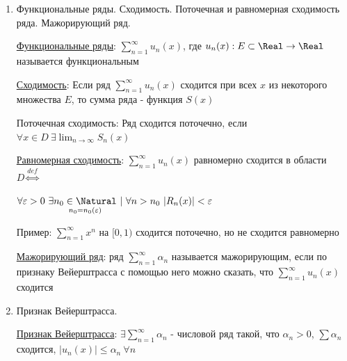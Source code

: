 \documentclass[12pt]{article}
\begin{document}
\begin{enumerate}
    \hyperlink{changingsignseries}{Знакопеременные ряды}: $\sum_{n = 1}^\infty u_n$, где $u_n$ - любого знака и не все $u_n$ одного знака

    \hyperlink{absoluteconvergence}{Абсолютная сходимость}: $\sum_{n = 1}^\infty |u_n|$ сходится $\Longrightarrow \sum_{n = 1}^\infty u_n$ сходится абсолютно

    \hyperlink{conditionalconvergence}{Условная сходимость}: $\sum_{n = 1}^\infty u_n$ сходится условно, если $\sum_{n = 1}^\infty |u_n|$ расходится

\subsection{X.2. Функциональные ряды.}

    \item Функциональные ряды. Сходимость. Поточечная и равномерная сходимость ряда.
    Мажорирующий ряд.

    \hyperlink{functionalseries}{Функциональные ряды}: $\sum_{n = 1}^\infty u_n(x)$, где $u_n(x) : E \subset \Real \to \Real$ называется функциональным

    \hyperlink{functionalseriesconvergence}{Сходимость}: Если ряд $\sum_{n = 1}^\infty u_n(x)$ сходится при всех $x$ из некоторого множества $E$, то сумма ряда -
    функция $S(x)$

    Поточечная сходимость: Ряд сходится поточечно, если $\forall x \in D \ \exists \lim_{n \to \infty} S_n(x)$

    \hyperlink{uniformconvergence}{Равномерная сходимость}:  $\sum_{n = 1}^\infty u_n(x)$ равномерно сходится в области $D \overset{def}{\Longleftrightarrow}$

    $\forall \varepsilon > 0 \ \exists \underset{n_0 = n_0(\varepsilon)}{n_0 \in \Natural} \ | \ \forall n > n_0 \ |R_n(x)| < \varepsilon$

    Пример: $\sum_{n = 1}^\infty x^n$ на $[0,1)$ сходится поточечно, но не сходится равномерно

    \hyperlink{majorseries}{Мажорирующий ряд}: ряд $\sum_{n = 1}^\infty \alpha_n$ называется мажорирующим, если по 
    признаку Вейерштрасса с помощью него можно сказать, что $\sum_{n = 1}^\infty u_n(x)$ сходится

    \item Признак Вейерштрасса.

    \hyperlink{weierstrassign}{Признак Вейерштрасса}: $\exists \sum_{n = 1}^\infty \alpha_n$ - числовой ряд такой, что $\alpha_n > 0$, $\sum \alpha_n$ сходится,
    $|u_n(x)| \leq \alpha_n \ \forall n$


\end{enumerate}
\end{document}
